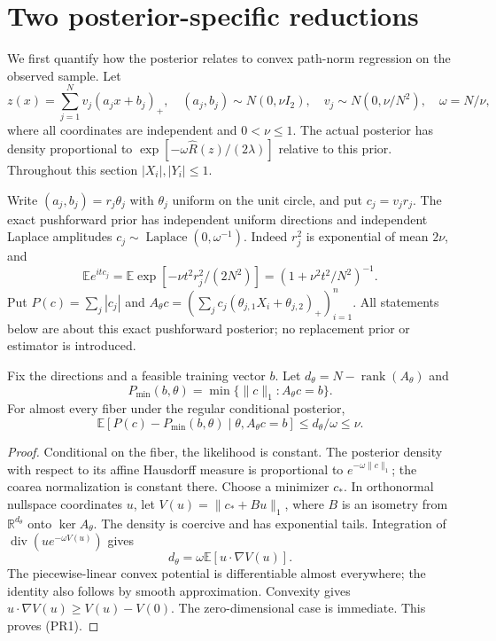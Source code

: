 \section{Two posterior-specific reductions}
We first quantify how the posterior relates to convex path-norm
regression on the observed sample.
Let
\[
 z(x)=\sum_{j=1}^N v_j(a_jx+b_j)_+,
 \quad (a_j,b_j)\sim N(0,\nu I_2),\quad
 v_j\sim N(0,\nu/N^2),\quad \omega=N/\nu,
\]
where all coordinates are independent and $0<\nu\le1$.
The actual posterior has density proportional to
$\exp[-\omega\widehat R(z)/(2\lambda)]$ relative to this prior.
Throughout this section $|X_i|,|Y_i|\le1$.

Write $(a_j,b_j)=r_j\theta_j$ with $\theta_j$ uniform on the unit
circle, and put $c_j=v_jr_j$. The exact pushforward prior has independent
uniform directions and independent Laplace amplitudes
$c_j\sim\operatorname{Laplace}(0,\omega^{-1})$.
Indeed $r_j^2$ is exponential of mean $2\nu$, and
\[
 \mathbb E e^{itc_j}
 =\mathbb E\exp[-\nu t^2r_j^2/(2N^2)]
 =(1+\nu^2t^2/N^2)^{-1}.
\]
Put $P(c)=\sum_j|c_j|$ and
$A_\theta c=(\sum_jc_j(\theta_{j,1}X_i+\theta_{j,2})_+)_{i=1}^n$.
All statements below are about this exact pushforward posterior;
no replacement prior or estimator is introduced.

\begin{proposition}
Fix the directions and a feasible training vector $b$.
Let $d_\theta=N-\operatorname{rank}(A_\theta)$ and
\[
 P_{\min}(b,\theta)=\min\{\|c\|_1:A_\theta c=b\}.
\]
For almost every fiber under the regular conditional posterior,
\[
 \mathbb E[P(c)-P_{\min}(b,\theta)\mid\theta,A_\theta c=b]
 \le d_\theta/\omega\le\nu. \tag{PR1}
\]
\end{proposition}
\begin{proof}
Conditional on the fiber, the likelihood is constant. The posterior
density with respect to its affine Hausdorff measure is proportional
to $e^{-\omega\|c\|_1}$; the coarea normalization is constant there.
Choose a minimizer $c_*$. In orthonormal nullspace coordinates $u$,
let $V(u)=\|c_*+Bu\|_1$, where $B$ is an isometry from
$\mathbb R^{d_\theta}$ onto $\ker A_\theta$.
The density is coercive and has exponential tails. Integration of
$\operatorname{div}(u e^{-\omega V(u)})$ gives
\[
 d_\theta=\omega\mathbb E[u\cdot\nabla V(u)].
\]
The piecewise-linear convex potential is differentiable almost
everywhere; the identity also follows by smooth approximation.
Convexity gives $u\cdot\nabla V(u)\ge V(u)-V(0)$.
The zero-dimensional case is immediate. This proves (PR1).
\end{proof}

